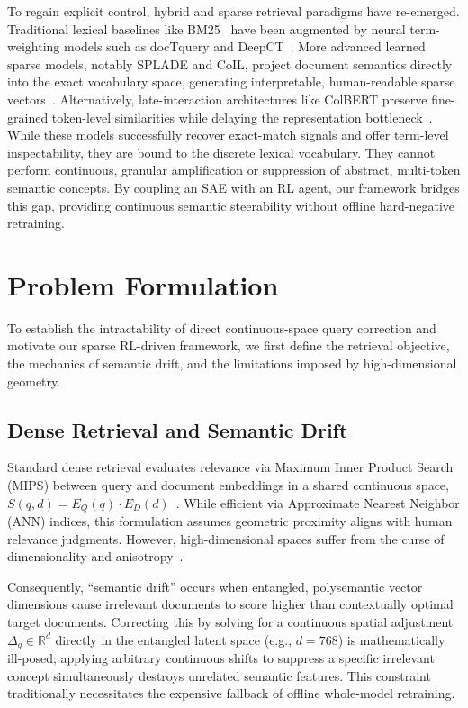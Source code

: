 \documentclass[sigconf]{acmart}
\begin{document}
To regain explicit control, hybrid and sparse retrieval paradigms have re-emerged. Traditional lexical baselines like BM25~\cite{robertson1994} have been augmented by neural term-weighting models such as docTquery and DeepCT~\cite{nogueira2019, dai2019}. More advanced learned sparse models, notably SPLADE and CoIL, project document semantics directly into the exact vocabulary space, generating interpretable, human-readable sparse vectors~\cite{formal2021splade, formal2021spladev2, gao2021coil}. Alternatively, late-interaction architectures like ColBERT preserve fine-grained token-level similarities while delaying the representation bottleneck~\cite{khattab2020, santhanam2022, lin2021, luan2021}. While these models successfully recover exact-match signals and offer term-level inspectability, they are bound to the discrete lexical vocabulary. They cannot perform continuous, granular amplification or suppression of abstract, multi-token semantic concepts. By coupling an SAE with an RL agent, our framework bridges this gap, providing continuous semantic steerability without offline hard-negative retraining.

\section{Problem Formulation}

To establish the intractability of direct continuous-space query correction and motivate our sparse RL-driven framework, we first define the retrieval objective, the mechanics of semantic drift, and the limitations imposed by high-dimensional geometry.

\subsection{Dense Retrieval and Semantic Drift}

Standard dense retrieval evaluates relevance via Maximum Inner Product Search (MIPS) between query and document embeddings in a shared continuous space, $S(q,d) = E_Q(q) \cdot E_D(d)$~\cite{johnson2019, shrivastava2014}. While efficient via Approximate Nearest Neighbor (ANN) indices, this formulation assumes geometric proximity aligns with human relevance judgments. However, high-dimensional spaces suffer from the curse of dimensionality and anisotropy~\cite{beyer1999, ethayarajh2019}.

Consequently, ``semantic drift'' occurs when entangled, polysemantic vector dimensions cause irrelevant documents to score higher than contextually optimal target documents. Correcting this by solving for a continuous spatial adjustment $\Delta_q \in \mathbb{R}^d$ directly in the entangled latent space (e.g., $d=768$) is mathematically ill-posed; applying arbitrary continuous shifts to suppress a specific irrelevant concept simultaneously destroys unrelated semantic features. This constraint traditionally necessitates the expensive fallback of offline whole-model retraining.
\end{document}
